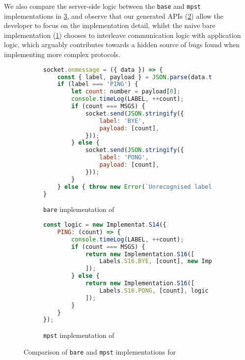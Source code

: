 We also compare the server-side logic between the \texttt{base} and
\texttt{mpst} implementations in \cref{fig:nodepingpong}, and observe
that our generated APIs (\cref{lst:nodepingpongmpst}) 
allow the developer to focus on the
implementation detail, whilst the naive bare implementation 
(\cref{lst:nodepingpongbare}) chooses to interleave communication logic
with application logic, which arguably contributes towards a hidden
source of bugs found when implementing more complex protocols.

\begin{figure}[!ht]
\centering
\begin{subfigure}[b]{\textwidth}
\centering
\begin{lstlisting}[language=javascript,tabsize=2]
socket.onmessage = ({ data }) => {
	const { label, payload } = JSON.parse(data.toString());
	if (label === 'PING') {
		let count: number = payload[0];
		console.timeLog(LABEL, ++count);
		if (count === MSGS) {
			socket.send(JSON.stringify({
				label: 'BYE',
				payload: [count],
			}));
		} else {
			socket.send(JSON.stringify({
				label: 'PONG',
				payload: [count],
			}));
		}
	} else { throw new Error(`Unrecognised label: ${label}`); }
}
\end{lstlisting}
\caption{\texttt{bare} implementation of  }
\label{lst:nodepingpongbare}
\end{subfigure}
\hfill
\begin{subfigure}[b]{\textwidth}
\centering
\begin{lstlisting}[language=javascript,tabsize=2]
const logic = new Implementat.S14({
	PING: (count) => {
		console.timeLog(LABEL, ++count);
		if (count === MSGS) {
			return new Implementation.S16([
				Labels.S16.BYE, [count], new Implementation.S15()
			]);
		} else {
			return new Implementation.S16([
				Labels.S16.PONG, [count], logic
			]);
		}
 	}
});
\end{lstlisting}
\caption{\texttt{mpst} implementation of  }
\label{lst:nodepingpongmpst}
\end{subfigure}
\caption{Comparison of \texttt{bare} and \texttt{mpst}
implementations for  }
\label{fig:nodepingpong}
\end{figure}

